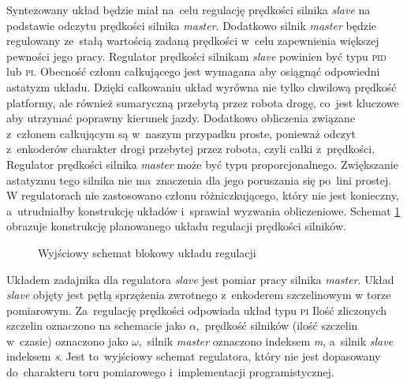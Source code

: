 \documentclass[11pt]{article}
\begin{document}
Syntezowany układ będzie miał na~celu regulację prędkości silnika \textit{slave} na podstawie odczytu prędkości silnika \textit{master}. Dodatkowo silnik \textit{master} będzie regulowany ze~stałą wartością zadaną prędkości w~celu zapewnienia większej pewności jego pracy.
Regulator prędkości silnikam \textit{slave} powinien być typu \textsc{pid} lub \textsc{pi}.
Obecność członu całkującego jest wymagana aby osiągnąć odpowiedni astatyzm układu.
Dzięki całkowaniu układ wyrówna nie tylko chwilową prędkość platformy, ale również sumaryczną przebytą przez robota drogę, co~jest kluczowe aby utrzymać poprawny kierunek jazdy.
Dodatkowo obliczenia związane z~członem całkującym są w~naszym przypadku proste, ponieważ odczyt z~enkoderów charakter drogi przebytej przez robota, czyli całki z~prędkości.
Regulator prędkości silnika \textit{master} może być typu proporcjonalnego.
Zwiększanie astatyzmu tego silnika nie ma~znaczenia dla jego poruszania się po~lini prostej.
W regulatorach nie zastosowano członu różniczkującego, który nie jest konieczny, a~utrudniałby konstrukcję układów i~sprawiał wyzwania obliczeniowe.
Schemat \ref{fig:tikz:control_block_1} obrazuje konstrukcję planowanego układu regulacji prędkości silników.
\begin{figure}[htbp]
	\centering
	
	\caption{Wyjściowy schemat blokowy układu regulacji}
	\label{fig:tikz:control_block_1}
\end{figure}
Układem zadajnika dla regulatora \textit{slave} jest pomiar pracy silnika \textit{master}.
Układ \textit{slave} objęty jest pętlą sprzężenia zwrotnego z~enkoderem szczelinowym w torze pomiarowym.
Za~regulację prędkości odpowiada układ typu \textsc{pi}
Ilość zliczonych szczelin oznaczono na schemacie jako $ \alpha $,~prędkość silników (ilość szczelin w~czasie) oznaczono jako $ \omega $,~silnik \textit{master} oznaczono indeksem \textit{m}, a~silnik \textit{slave} indeksem \textit{s}.
Jest to~wyjściowy schemat regulatora, który nie jest dopasowany do~charakteru toru pomiarowego i~implementacji programistycznej.
\end{document}
